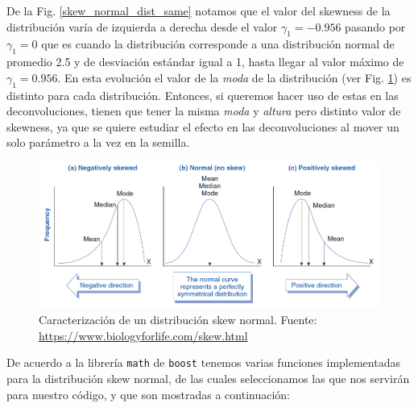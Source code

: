 \documentclass[11pt,letterpaper]{article}
\begin{document}
De la Fig. \ref{skew_normal_dist_same} notamos que el valor del skewness de la distribución varía de izquierda a derecha desde el valor $\gamma_1=-0.956$ pasando por $\gamma_1=0$ que es cuando la distribución corresponde a una distribución normal de promedio 2.5 y de desviación estándar igual a 1, hasta llegar al valor máximo de $\gamma_1=0.956$. En esta evolución el valor de la \textit{moda} de la distribución (ver Fig.
\ref{skew_normal_dist_parameters}) es distinto para cada distribución. Entonces, si queremos hacer uso de estas en las deconvoluciones, tienen que tener la misma \textit{moda} y \textit{altura} pero distinto valor de skewness, ya que se quiere estudiar el efecto en las deconvoluciones al mover un solo parámetro a la vez en la semilla.

 \begin{figure}[H]
    \includegraphics[width=1.\textwidth]{img/skew_normal_parameters.png}
    \centering
     \cprotect\caption{Caracterización de un distribución skew normal. Fuente: \url{https://www.biologyforlife.com/skew.html} } 
\label{skew_normal_dist_parameters}
\end{figure}

De acuerdo a la librería \verb|math| de \verb|boost| tenemos varias funciones implementadas para la distribución skew normal, de las cuales seleccionamos las que nos servirán para nuestro código, y que son mostradas a continuación:
\end{document}
